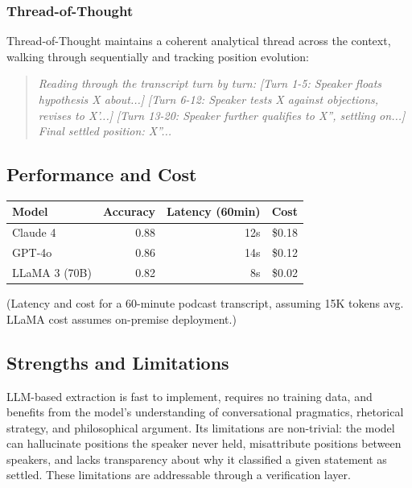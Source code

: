 \documentclass[11pt,letterpaper]{article}
\begin{document}
\subsubsection{Thread-of-Thought}

Thread-of-Thought maintains a coherent analytical thread across the context, walking through sequentially and tracking position evolution:

\begin{quote}
\textit{Reading through the transcript turn by turn:}
\textit{[Turn 1-5: Speaker floats hypothesis X about...]}
\textit{[Turn 6-12: Speaker tests X against objections, revises to X'...]}
\textit{[Turn 13-20: Speaker further qualifies to X'', settling on...]}
\textit{Final settled position: X''...}
\end{quote}

\subsection{Performance and Cost}

\begin{center}
\begin{tabular}{lrrr}
  \toprule
  \textbf{Model} & \textbf{Accuracy} & \textbf{Latency (60min)} & \textbf{Cost} \\
  \midrule
  Claude 4 & 0.88 & 12s & \$0.18 \\
  GPT-4o & 0.86 & 14s & \$0.12 \\
  LLaMA 3 (70B) & 0.82 & 8s & \$0.02 \\
  \bottomrule
\end{tabular}
\end{center}

(Latency and cost for a 60-minute podcast transcript, assuming 15K tokens avg. LLaMA cost assumes on-premise deployment.)

\subsection{Strengths and Limitations}

LLM-based extraction is fast to implement, requires no training data, and benefits from the model's understanding of conversational pragmatics, rhetorical strategy, and philosophical argument. Its limitations are non-trivial: the model can hallucinate positions the speaker never held, misattribute positions between speakers, and lacks transparency about why it classified a given statement as settled. These limitations are addressable through a verification layer.
\end{document}
